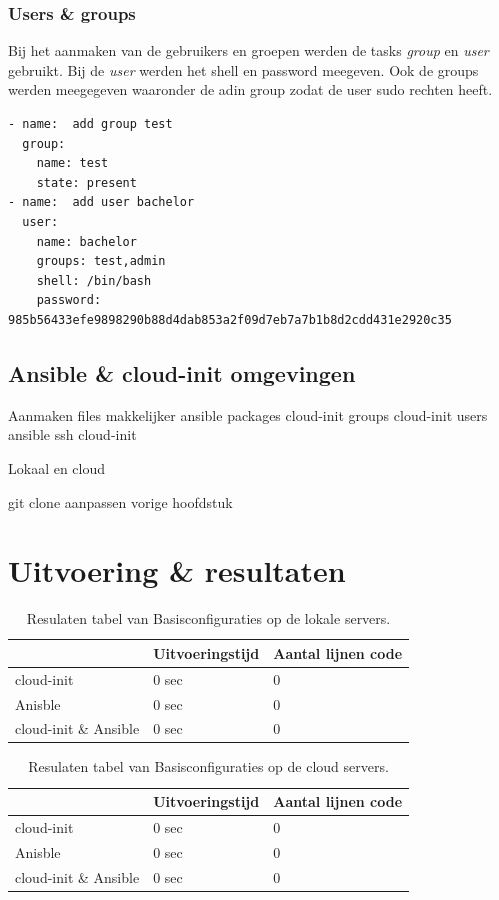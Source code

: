 \subsubsection{Users \& groups}
Bij het aanmaken van de gebruikers en groepen werden de tasks \textit{group} en \textit{user} gebruikt. Bij de \textit{user} werden het shell en password meegeven. Ook de groups werden meegegeven waaronder de adin group zodat de user sudo rechten heeft.
\begin{lstlisting}
- name:  add group test
  group:
    name: test
    state: present
- name:  add user bachelor
  user:
    name: bachelor
    groups: test,admin
    shell: /bin/bash
    password: 985b56433efe9898290b88d4dab853a2f09d7eb7a7b1b8d2cdd431e2920c35
\end{lstlisting}

\subsection{Ansible \& cloud-init omgevingen}
Aanmaken files makkelijker ansible
packages cloud-init
groups cloud-init
users ansible
ssh cloud-init

Lokaal en cloud

git clone aanpassen vorige hoofdstuk

\section{Uitvoering \& resultaten}

\begin{table}[!htb]
    \centering
    \begin{tabular}{| l | l | l |}
        \hline
         & \textbf{Uitvoeringstijd} & \textbf{Aantal lijnen code}  \\ \hline
        cloud-init & 0 sec & 0 \\ \hline
        Anisble & 0 sec & 0 \\ \hline
        cloud-init \& Ansible & 0 sec & 0 \\
        \hline
    \end{tabular}
	\caption{Resulaten tabel van Basisconfiguraties op de lokale servers.}
    \label{tab:tabel lokale resultaten basis}
\end{table}

\begin{table}[!htb]
    \centering
    \begin{tabular}{| l | l | l |}
        \hline
        & \textbf{Uitvoeringstijd} & \textbf{Aantal lijnen code}  \\ \hline
        cloud-init & 0 sec & 0 \\ \hline
        Anisble & 0 sec & 0 \\ \hline
        cloud-init \& Ansible & 0 sec & 0 \\
        \hline
    \end{tabular}
    \caption{Resulaten tabel van Basisconfiguraties op de cloud servers.}
    \label{tab:tabel cloud resultaten basis}
\end{table}


